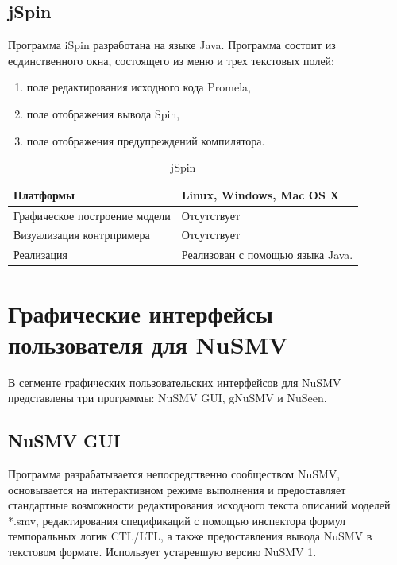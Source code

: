 \subsection{jSpin}

Программа iSpin разработана на языке Java. Программа состоит из есдинственного окна, состоящего из меню и трех текстовых полей:

\begin{enumerate}
	\item поле редактирования исходного кода Promela,
	\item поле отображения вывода Spin,
	\item поле отображения предупреждений компилятора.
\end{enumerate}


\begin{table}[ht]
	\caption{jSpin}\label{tab:jspin}
	\centering
	\begin{tabular}{|m{2.5 cm}|m{7.5 cm}|}
		\hline
		Платформы & Linux, Windows, Mac OS X \\
		\hline
		Графическое построение модели &Отсутствует \\
		\hline
		Визуализация контрпримера & Отсутствует \\
		\hline
		Реализация & Реализован с помощью языка Java.\\
		\hline
	\end{tabular}
\end{table}

\section{Графические интерфейсы пользователя для NuSMV}

В сегменте графических пользовательских интерфейсов для NuSMV представлены три программы: NuSMV GUI, gNuSMV и NuSeen.

\subsection{NuSMV GUI}

Программа разрабатывается непосредственно сообществом NuSMV, основывается на интерактивном режиме выполнения и предоставляет стандартные возможности редактирования исходного текста описаний моделей *.smv, редактирования спецификаций с помощью инспектора формул темпоральных логик CTL/LTL, а также предоставления вывода NuSMV в текстовом формате. Использует устаревшую версию NuSMV 1.

